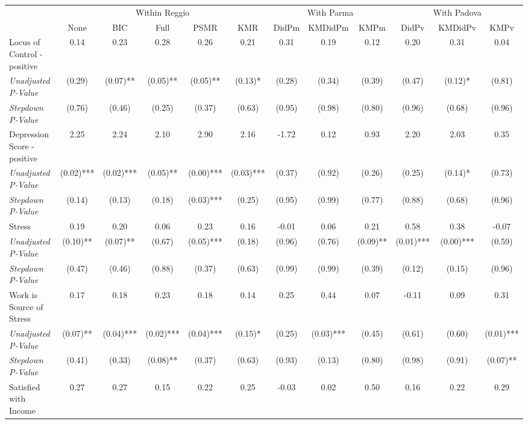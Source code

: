 \begin{tabular}{l c c c c c c c c c c c}
\toprule
& \multicolumn{5}{c}{Within Reggio} & \multicolumn{3}{c}{With Parma} & \multicolumn{3}{c}{With Padova} \\\cmidrule(lr){2-6} \cmidrule(lr){7-9} \cmidrule(lr){10-12}
 & None & BIC & Full & PSMR & KMR & DidPm & KMDidPm & KMPm & DidPv & KMDidPv & KMPv \\
\midrule
Locus of Control - positive & 0.14 & 0.23 & 0.28 & 0.26 & 0.21 & 0.31 & 0.19 & 0.12 & 0.20 & 0.31 & 0.04 \\
\quad \textit{Unadjusted P-Value} & (0.29) & (0.07)** & (0.05)** & (0.05)** & (0.13)* & (0.28) & (0.34) & (0.39) & (0.47) & (0.12)* & (0.81) \\
\quad \textit{Stepdown P-Value} & (0.76) & (0.46) & (0.25) & (0.37) & (0.63) & (0.95) & (0.98) & (0.80) & (0.96) & (0.68) & (0.96) \\
Depression Score - positive & 2.25 & 2.24 & 2.10 & 2.90 & 2.16 & -1.72 & 0.12 & 0.93 & 2.20 & 2.03 & 0.35 \\
\quad \textit{Unadjusted P-Value} & (0.02)*** & (0.02)*** & (0.05)** & (0.00)*** & (0.03)*** & (0.37) & (0.92) & (0.26) & (0.25) & (0.14)* & (0.73) \\
\quad \textit{Stepdown P-Value} & (0.14) & (0.13) & (0.18) & (0.03)*** & (0.25) & (0.95) & (0.99) & (0.77) & (0.88) & (0.68) & (0.96) \\
Stress & 0.19 & 0.20 & 0.06 & 0.23 & 0.16 & -0.01 & 0.06 & 0.21 & 0.58 & 0.38 & -0.07 \\
\quad \textit{Unadjusted P-Value} & (0.10)** & (0.07)** & (0.67) & (0.05)*** & (0.18) & (0.96) & (0.76) & (0.09)** & (0.01)*** & (0.00)*** & (0.59) \\
\quad \textit{Stepdown P-Value} & (0.47) & (0.46) & (0.88) & (0.37) & (0.63) & (0.99) & (0.99) & (0.39) & (0.12) & (0.15) & (0.96) \\
Work is Source of Stress & 0.17 & 0.18 & 0.23 & 0.18 & 0.14 & 0.25 & 0.44 & 0.07 & -0.11 & 0.09 & 0.31 \\
\quad \textit{Unadjusted P-Value} & (0.07)** & (0.04)*** & (0.02)*** & (0.04)*** & (0.15)* & (0.25) & (0.03)*** & (0.45) & (0.61) & (0.60) & (0.01)*** \\
\quad \textit{Stepdown P-Value} & (0.41) & (0.33) & (0.08)** & (0.37) & (0.63) & (0.93) & (0.13) & (0.80) & (0.98) & (0.91) & (0.07)** \\
Satisfied with Income & 0.27 & 0.27 & 0.15 & 0.22 & 0.25 & -0.03 & 0.02 & 0.50 & 0.16 & 0.22 & 0.29 \\

\end{tabular}
